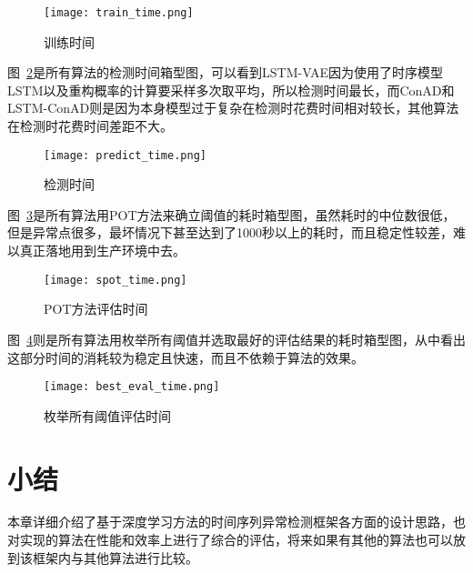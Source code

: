 \begin{figure}[htbp]
  \centering
  \texttt{[image: train\_time.png]}
  \caption{训练时间}
  \label{fig:train:time}
\end{figure}

图~\ref{fig:test:time}是所有算法的检测时间箱型图，可以看到LSTM-VAE因为使用了时序模型LSTM以及重构概率的计算要采样多次取平均，所以检测时间最长，而ConAD和LSTM-ConAD则是因为本身模型过于复杂在检测时花费时间相对较长，其他算法在检测时花费时间差距不大。

\begin{figure}[htbp]
  \centering
  \texttt{[image: predict\_time.png]}
  \caption{检测时间}
  \label{fig:test:time}
\end{figure}

图~\ref{fig:pot:time}是所有算法用POT方法来确立阈值的耗时箱型图，虽然耗时的中位数很低，但是异常点很多，最坏情况下甚至达到了1000秒以上的耗时，而且稳定性较差，难以真正落地用到生产环境中去。

\begin{figure}[htbp]
  \centering
  \texttt{[image: spot\_time.png]}
  \caption{POT方法评估时间}
  \label{fig:pot:time}
\end{figure}

图~\ref{fig:eval:time}则是所有算法用枚举所有阈值并选取最好的评估结果的耗时箱型图，从中看出这部分时间的消耗较为稳定且快速，而且不依赖于算法的效果。

\begin{figure}[htbp]
  \centering
  \texttt{[image: best\_eval\_time.png]}
  \caption{枚举所有阈值评估时间}
  \label{fig:eval:time}
\end{figure}

\section{小结}
本章详细介绍了基于深度学习方法的时间序列异常检测框架各方面的设计思路，也对实现的算法在性能和效率上进行了综合的评估，将来如果有其他的算法也可以放到该框架内与其他算法进行比较。



